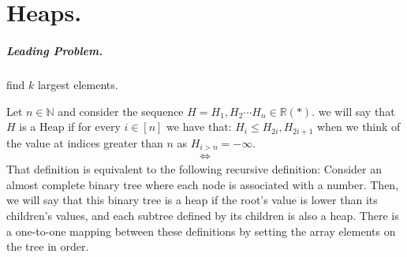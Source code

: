 


\ifdefined\BOOK
\else
\setcounter{chapter}{5}
\fi

\chapter{Heaps.} 

  \paragraph{Leading Problem.} find $k$ largest elements.  

  \begin{definition}
    
  Let $n \in \mathbb{N}$ and consider the sequence $H = H_{1}, H_{2} \cdots H_{n} \in \mathbb{R} \left( * \right)$. we will say that $H$ is a Heap if for every $i \in [n]$ we have that: $H_{i} \le H_{2i}, H_{2i + 1}$ when we think of the value at indices greater than $n$ as $H_{i>n} = -\infty$. 
  \begin{equation*}
    \begin{split}
      \Leftrightarrow
    \end{split}
  \end{equation*} 
That definition is equivalent to the following recursive definition: Consider an almost complete binary tree where each node is associated with a number. Then, we will say that this binary tree is a heap if the root's value is lower than its children's values, and each subtree defined by its children is also a heap. There is a one-to-one mapping between these definitions by setting the array elements on the tree in order.

  \end{definition}

